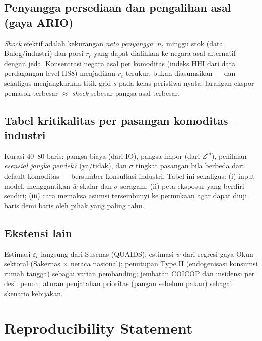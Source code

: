 \documentclass[
  manuscript=article,
  layout=publish,
  year=2026,
  volume=1,
]{den}
\begin{document}
\subsection{Penyangga persediaan dan pengalihan asal (gaya
ARIO)}\label{penyangga-persediaan-dan-pengalihan-asal-gaya-ario}

\emph{Shock} efektif adalah kekurangan \emph{neto penyangga}: \(n_c\)
minggu stok (data Bulog/industri) dan porsi \(r_c\) yang dapat dialihkan
ke negara asal alternatif dengan jeda. Konsentrasi negara asal per
komoditas (indeks HHI dari data perdagangan level HS8) menjadikan
\(r_c\) terukur, bukan diasumsikan --- dan sekaligus menjangkarkan titik
grid \(s\) pada kelas peristiwa nyata: larangan ekspor pemasok terbesar
\(\approx\) \emph{shock} sebesar pangsa asal terbesar.

\subsection{Tabel kritikalitas per pasangan
komoditas--industri}\label{tabel-kritikalitas-per-pasangan-komoditasindustri}

Kurasi 40--80 baris: pangsa biaya (dari IO), pangsa impor (dari
\(Z^m\)), penilaian \emph{esensial jangka pendek?} (ya/tidak), dan
\(\sigma\) tingkat pasangan bila berbeda dari default komoditas ---
bersumber konsultasi industri. Tabel ini sekaligus: (i) input model,
menggantikan \(\bar w\) skalar dan \(\sigma\) seragam; (ii) peta
eksposur yang berdiri sendiri; (iii) cara memaksa asumsi tersembunyi ke
permukaan agar dapat diuji baris demi baris oleh pihak yang paling tahu.

\subsection{Ekstensi lain}\label{ekstensi-lain}

Estimasi \(\varepsilon_c\) langsung dari Susenas (QUAIDS); estimasi
\(\psi\) dari regresi gaya Okun sektoral (Sakernas \(\times\) neraca
nasional); penutupan Type II (endogenisasi konsumsi rumah tangga)
sebagai varian pembanding; jembatan COICOP dan insidensi per desil
penuh; aturan penjatahan prioritas (pangan sebelum pakan) sebagai
skenario kebijakan.

\section*{Reproducibility Statement}\label{reproducibility-statement}
\end{document}
